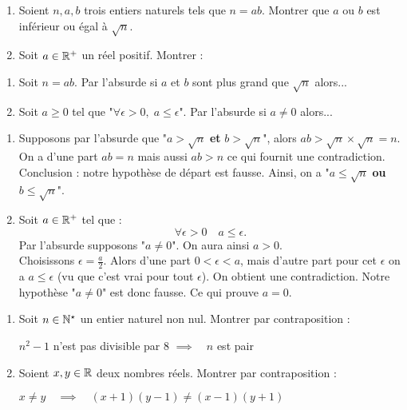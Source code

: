 \documentclass[11pt,class=report,crop=false]{standalone}
\begin{document}
\exercice{}
\sauteligne
\begin{enumerate}
    \item Soient $n, a, b$ trois entiers naturels tels que $n=ab$. Montrer que $a$ ou $b$ est inférieur ou égal à $\sqrt{n}$.
    
    \item Soit $a \in \mathbb{R}^+$ un réel positif. Montrer :
\end{enumerate} 
\finenonce

\indication
\sauteligne
\begin{enumerate}
    \item Soit $n=ab$. Par l'absurde si $a$ et $b$ sont plus grand que $\sqrt{n}$ alors...
    
    \item Soit $a \geq 0$ tel que "$\forall \epsilon>0, \; a \leq \epsilon$". Par l'absurde si $a \neq 0$ alors...
\end{enumerate}
\finindication

\correction
\sauteligne
\begin{enumerate}
    \item Supposons par l'absurde que "$a>\sqrt{n}$ \textbf{et} $b>\sqrt{n}$", alors $ab > \sqrt{n} \times \sqrt{n} = n$. On a d'une part $ab=n$ mais aussi $ab>n$ ce qui fournit une contradiction.
    Conclusion : notre hypothèse de départ est fausse. Ainsi, on a "$a \le\sqrt{n}$ \textbf{ou} $b\le\sqrt{n}$".
    
    \item Soit $a \in \mathbb{R}^+$ tel que :
    $$\forall \epsilon>0 \quad a \leq \epsilon.$$
    Par l'absurde supposons "$a \neq 0$". On aura ainsi $a > 0$.\\
    Choisissons $\epsilon = \frac{a}{2}$. Alors d'une part $0 < \epsilon < a$, mais d'autre part pour cet $\epsilon$ on a $a \le \epsilon$ (vu que c'est vrai pour tout $\epsilon$). On obtient une contradiction. Notre hypothèse  "$a \neq 0$" est donc fausse. Ce qui prouve $a=0$.
\end{enumerate}
\fincorrection
\finexercice



\exercice{}
\sauteligne
\begin{enumerate}
    \item Soit $n \in \mathbb{N}^\star$ un entier naturel non nul. Montrer par contraposition :\\
    \centerline{$n^2-1$ n'est pas divisible par $8$ \quad $\implies \quad n$ est pair}
    
    \item Soient $x,y \in \mathbb{R}$ deux nombres réels. Montrer par contraposition :\\
    \centerline{$x\neq y \quad  \implies \quad (x+1)(y-1)\neq (x-1)(y+1)$}
\end{enumerate}
\finenonce
\end{document}
